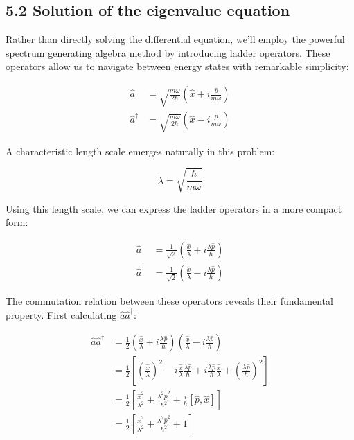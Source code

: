 \documentclass[10pt]{article}
\begin{document}
\subsection*{5.2 Solution of the eigenvalue equation}

Rather than directly solving the differential equation, we'll employ the powerful spectrum generating algebra method by introducing ladder operators. These operators allow us to navigate between energy states with remarkable simplicity:

\begin{align*}
\hat{a} &= \sqrt{\frac{m\omega}{2\hbar}}\left(\hat{x} + i\frac{\hat{p}}{m\omega}\right) \tag{5.5} \\
\hat{a}^\dagger &= \sqrt{\frac{m\omega}{2\hbar}}\left(\hat{x} - i\frac{\hat{p}}{m\omega}\right)
\end{align*}

A characteristic length scale emerges naturally in this problem:

\begin{equation*}
\lambda = \sqrt{\frac{\hbar}{m\omega}} \tag{5.6}
\end{equation*}

Using this length scale, we can express the ladder operators in a more compact form:

\begin{align*}
\hat{a} &= \frac{1}{\sqrt{2}}\left(\frac{\hat{x}}{\lambda} + i\frac{\lambda\hat{p}}{\hbar}\right) \tag{5.7} \\
\hat{a}^\dagger &= \frac{1}{\sqrt{2}}\left(\frac{\hat{x}}{\lambda} - i\frac{\lambda\hat{p}}{\hbar}\right)
\end{align*}

The commutation relation between these operators reveals their fundamental property. First calculating $\hat{a}\hat{a}^\dagger$:

\begin{align*}
\hat{a}\hat{a}^\dagger &= \frac{1}{2}\left(\frac{\hat{x}}{\lambda} + i\frac{\lambda\hat{p}}{\hbar}\right)\left(\frac{\hat{x}}{\lambda} - i\frac{\lambda\hat{p}}{\hbar}\right) \\
&= \frac{1}{2}\left[\left(\frac{\hat{x}}{\lambda}\right)^2 - i\frac{\hat{x}}{\lambda}\frac{\lambda\hat{p}}{\hbar} + i\frac{\lambda\hat{p}}{\hbar}\frac{\hat{x}}{\lambda} + \left(\frac{\lambda\hat{p}}{\hbar}\right)^2\right] \\
&= \frac{1}{2}\left[\frac{\hat{x}^2}{\lambda^2} + \frac{\lambda^2\hat{p}^2}{\hbar^2} + \frac{i}{\hbar}[\hat{p},\hat{x}]\right] \tag{5.8} \\
&= \frac{1}{2}\left[\frac{\hat{x}^2}{\lambda^2} + \frac{\lambda^2\hat{p}^2}{\hbar^2} + 1\right]
\end{align*}
\end{document}
